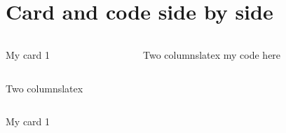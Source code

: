 \documentclass[aspectratio=1610,dvipsnames, noamsthm]{beamer}
\begin{document}
\usePrimaryIndigo
\useAccentBrown


\section{Card and code side by side}
\begin{frame}[fragile]{\secname}
\begin{columns}
  \begin{column}{0.465\linewidth}
    \begin{card}[Card1]
      My card 1
    \end{card}
  \end{column}
  \begin{column}{0.465\linewidth}
    \begin{codeEnv}{Two columns}{latex}
my code here
    \end{codeEnv}

  \end{column}
\end{columns}
\begin{codeEnv}[escapeinside=||]{Two columns}{latex}
\begin{columns}
  \begin{column}{0.5\linewidth}
    \begin{card}[Card1]
      My card 1
    \end{card}
  \end{column}
\end{frame}


\usePrimaryLime
\useAccentIndigo
\end{document}
